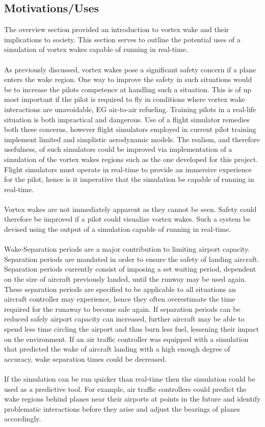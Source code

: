 \subsection{Motivations/Uses}
The overview section provided an introduction to vortex wake and their implications to society. This section serves to outline the potential uses of a simulation of vortex wakes capable of running in real-time.
\\\\
As previously discussed, vortex wakes pose a significant safety concern if a plane enters the wake region. One way to improve the safety in such situations would be to increase the pilots competence at handling such a situation. This is of up most important if the pilot is required to fly in conditions where vortex wake interactions are unavoidable, EG air-to-air refueling. Training pilots in a real-life situation is both impractical and dangerous. Use of a flight simulator remedies both these concerns, however flight simulators employed in current pilot training implement limited and simplistic aerodynamic models. The realism, and therefore usefulness, of such simulators could be improved via implementation of a simulation of the vortex wakes regions such as the one developed for this project. Flight simulators must operate in real-time to provide an immersive experience for the pilot, hence is it imperative that the simulation be capable of running in real-time.
\\\\
Vortex wakes are not immediately apparent as they cannot be seen. Safety could therefore be improved if a pilot could visualize vortex wakes. Such a system be devised using the output of a simulation capable of running in real-time. 
\\\\
Wake-Separation periods are a major contribution to limiting airport capacity. Separation periods are mandated in order to ensure the safety of landing aircraft. Separation periods currently consist of imposing a set waiting period, dependent on the size of aircraft previously landed, until the runway may be used again. These separation periods are specified to be applicable to all situations an aircraft controller may experience, hence they often overestimate the time required for the runaway to become safe again. If separation periods can be reduced safely airport capacity can increased, further aircraft may be able to spend less time circling the airport and thus burn less fuel, lessening their impact on the environment. If an air traffic controller was equipped with a simulation that predicted the wake of aircraft landing with a high enough degree of accuracy, wake separation times could be decreased.
\\\\
If the simulation can be run quicker than real-time then the simulation could be used as a predictive tool. For example, air traffic controllers could predict the wake regions behind planes near their airports at points in the future and identify problematic interactions before they arise and adjust the bearings of planes accordingly.

